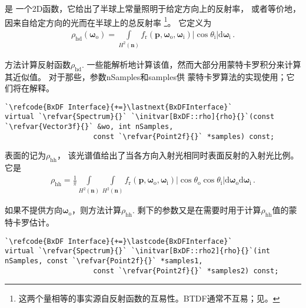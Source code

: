 是
一个2D函数，它给出了半球上常量照明于给定方向上的反射率，
或者等价地，因来自给定方向的光而在半球上的总反射率
\footnote{这两个量相等的事实源自反射函数的互易性。BTDF通常不互易；见。}。
它定义为
\begin{align}
    \label{eq:8.1}
    \rho_{\mathrm{hd}}({\bm\omega}_{\mathrm{o}})=\int\limits_{H^2({\bm n})}{f_{\mathrm{r}}({\bm p},{\bm \omega}_\mathrm{o},{\bm \omega}_\mathrm{i})|\cos{\theta_{\mathrm{i}}}|\mathrm{d}{\bm \omega}_\mathrm{i}}\, .
\end{align}

方法计算反射函数$\rho_{\mathrm{hd}}$.
一些能解析地计算该值，然而大部分用蒙特卡罗积分来计算其近似值。
对于那些，参数{\ttfamily nSamples}和{\ttfamily samples}供
蒙特卡罗算法的实现使用；它们将在解释。
\begin{lstlisting}
`\refcode{BxDF Interface}{+=}\lastnext{BxDFInterface}`
virtual `\refvar{Spectrum}{}` `\initvar[BxDF::rho]{rho}{}`(const `\refvar{Vector3f}{}` &wo, int nSamples,
                     const `\refvar{Point2f}{}` *samples) const;
\end{lstlisting}

表面的记为$\rho_{\mathrm{hh}}$，
该光谱值给出了当各方向入射光相同时表面反射的入射光比例。它是
\begin{align*}
    \rho_{\mathrm{hh}}=\frac{1}{\pi}\int\limits_{H^2({\bm n})}\int\limits_{H^2({\bm n})}f_{\mathrm{r}}({\bm p},{\bm \omega}_\mathrm{o},{\bm \omega}_\mathrm{i})|\cos{\theta_{\mathrm{o}}}\cos{\theta_{\mathrm{i}}}|\mathrm{d}{\bm \omega}_\mathrm{o}\mathrm{d}{\bm \omega}_\mathrm{i}\, .
\end{align*}

如果不提供方向${\bm\omega}_\mathrm{o}$，则方法计算$\rho_{\mathrm{hh}}$.
剩下的参数又是在需要时用于计算$\rho_{\mathrm{hh}}$值的蒙特卡罗估计。
\begin{lstlisting}
`\refcode{BxDF Interface}{+=}\lastcode{BxDFInterface}`
virtual `\refvar{Spectrum}{}` `\initvar[BxDF::rho2]{rho}{}`(int nSamples, const `\refvar{Point2f}{}` *samples1,
                     const `\refvar{Point2f}{}` *samples2) const;
\end{lstlisting}

